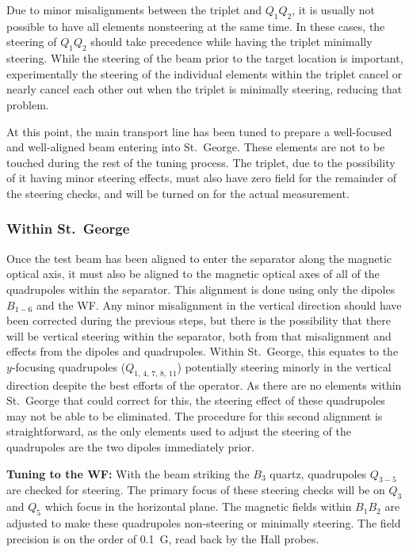 Due to minor misalignments between the triplet and $Q_1Q_2$, it is usually not
possible to have all elements nonsteering at the same time. In these cases, the
steering of $Q_1Q_2$ should take precedence while having the triplet minimally
steering. While the steering of the beam prior to the target location is
important, experimentally the steering of the individual elements within the
triplet cancel or nearly cancel each other out when the triplet is minimally
steering, reducing that problem.

At this point, the main transport line has been tuned to prepare a well-focused
and well-aligned beam entering into St.\ George. These elements are not to be
touched during the rest of the tuning process. The triplet, due to the
possibility of it having minor steering effects, must also have zero field for
the remainder of the steering checks, and will be turned on for the actual
measurement.

\subsubsection{Within St.\ George}
\label{sec:tuning_stg}

Once the test beam has been aligned to enter the separator along the magnetic
optical axis, it must also be aligned to the magnetic optical axes of all of
the quadrupoles within the separator. This alignment is done using only the
dipoles $B_{1-6}$ and the WF. Any minor misalignment in the vertical
direction should have been corrected during the previous steps, but there is
the possibility that there will be vertical steering within the separator, both
from that misalignment and effects from the dipoles and
quadrupoles. Within St.\ George, this equates to the $y$-focusing quadrupoles
($Q_{1,\,4,\,7,\,8,\,11}$) potentially steering minorly in the vertical
direction despite the best efforts of the operator. As there are no elements
within St.\ George that could correct for this, the steering effect of these
quadrupoles may not be able to be eliminated. The procedure for this second
alignment is straightforward, as the
only elements used to adjust the steering of the quadrupoles are the two
dipoles immediately prior.

\textbf{Tuning to the WF:}
With the beam striking the $B_3$ quartz, quadrupoles $Q_{3-5}$ are checked for
steering. The primary focus of these steering
checks will be on $Q_3$ and $Q_5$ which focus in the horizontal plane. The
magnetic fields within $B_1B_2$ are
adjusted to make these quadrupoles non-steering or minimally steering. The
field precision is on the order of 0.1~G, read back by the Hall probes.

